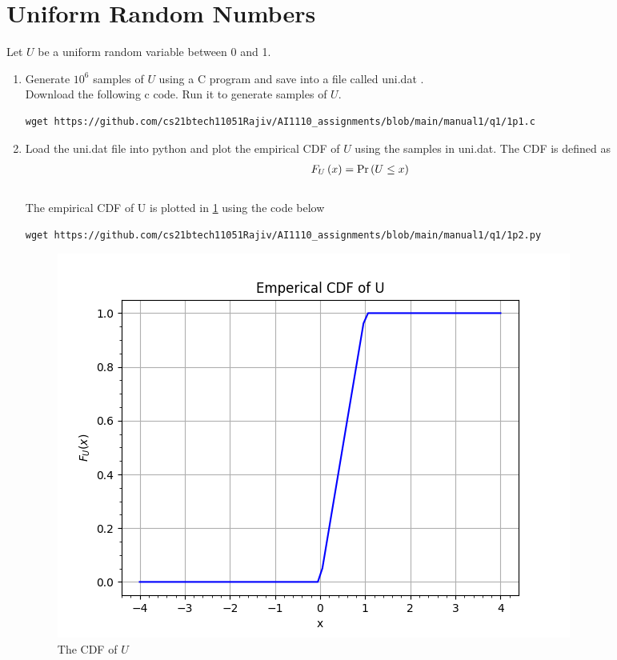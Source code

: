 \documentclass[journal,12pt,twocolumn]{IEEEtran}
\renewcommand\thesection{\arabic{section}}
\begin{document}
\section{Uniform Random Numbers}
Let $U$ be a uniform random variable between 0 and 1.
\begin{enumerate}[label=\thesection.\arabic*
,ref=\thesection.\theenumi]
\item Generate $10^6$ samples of $U$ using a C program and save into a file called uni.dat .
\\
\solution Download the following c code. Run it to generate samples of $U$.
\begin{lstlisting}
wget https://github.com/cs21btech11051Rajiv/AI1110_assignments/blob/main/manual1/q1/1p1.c
\end{lstlisting}
%
\item
Load the uni.dat file into python and plot the empirical CDF of $U$ using the samples in uni.dat. The CDF is defined as
\begin{align}
    F_{U}\left(x\right) = \Pr\left(U \le x\right)
\end{align}
\\
\solution The empirical CDF of U is plotted in \ref{fig:uni_cdf}
using the code below
\begin{lstlisting}
wget https://github.com/cs21btech11051Rajiv/AI1110_assignments/blob/main/manual1/q1/1p2.py
\end{lstlisting}
\begin{figure}
    \centering
    \includegraphics[width=\columnwidth]{./figs/fig1.2.png}
    \caption{The CDF of $U$}
    \label{fig:uni_cdf}
\end{figure}

\end{enumerate}
\end{document}
